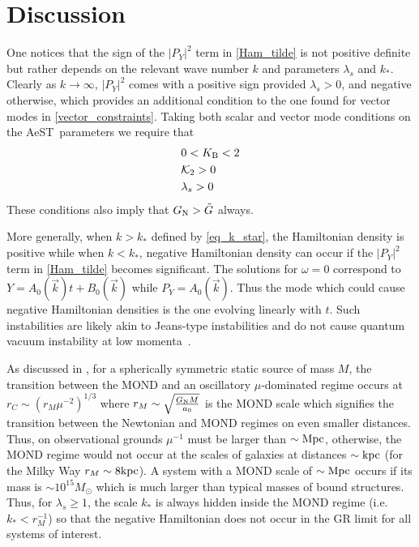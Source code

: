 \documentclass[twocolumn,prd,preprintnumbers,amsmath,amssymb,nofootinbib,superscriptaddress]{revtex4-1}
\newcommand{\AeST}{AeST~}
\newcommand{\lambdas}{\lambda_s}
\newcommand{\Mpc}{\ensuremath{{\rm Mpc}}}
\newcommand{\kpc}{\ensuremath{{\rm kpc}}}
\newcommand{\Kcal}{{\cal K}}
\newcommand{\Gt}{\ensuremath{\tilde{G}}}
\newcommand{\GN}{\ensuremath{G_{{\rm N}}}}
\newcommand{\KB}{\ensuremath{K_{{\rm B}}}}
\begin{document}
\section{Discussion}
\label{Sec_discussion}
One notices that the sign of the $|P_Y|^2$ term in \eqref{Ham_tilde}  is not positive definite but rather depends on the relevant wave number $k$ and parameters $\lambdas$ and $k_*$.
Clearly as $k\rightarrow \infty$, $|P_Y|^2$ comes with a positive sign provided $\lambdas>0$, and negative otherwise, which provides an additional condition to the one found for
vector modes in \eqref{vector_constraints}.
Taking both scalar and vector mode conditions on the \AeST parameters we require that 
\begin{align}
& 0 < \KB < 2
\\
& 
 \Kcal_2 > 0
\\
& \lambdas >0
\end{align}
These conditions also imply that $\GN > \Gt$ always.

More generally, when $k> k_*$ defined 
by \eqref{eq_k_star}, the Hamiltonian density is positive while when $k< k_*$, negative Hamiltonian density can occur if the $|P_Y|^2$ term in \eqref{Ham_tilde} becomes
significant. The solutions for $\omega=0$ correspond to $Y = A_0(\vec{k}) t + B_0(\vec{k})$ while $P_Y = A_0(\vec{k})$. Thus the mode which could cause negative 
Hamiltonian densities is the one evolving linearly with $t$.
Such instabilities are likely akin to Jeans-type instabilities and do not cause quantum vacuum instability at low momenta~\cite{GumrukcuogluMukohyamaSotiriou2016}.     


As discussed in \cite{Skordis:2020eui}, for a spherically symmetric static source of mass $M$, the transition between the MOND and an oscillatory $\mu$-dominated regime 
occurs at $r_C \sim \left(r_M \mu^{-2}\right)^{1/3}$ where $r_M \sim \sqrt{\frac{\GN M}{a_0}}$ is the MOND scale which signifies the transition between the Newtonian 
and MOND regimes on even smaller distances.  Thus, on observational grounds $\mu^{-1}$ must be larger than $\sim \Mpc$, otherwise, the MOND regime would not occur at the scales of galaxies 
at distances $\sim \kpc$ (for the Milky Way $r_M \sim 8 \kpc$).  A system with a MOND scale of $\sim \Mpc$ occurs if its mass is $\sim 10^{15} M_{\odot}$  which is much larger than
typical masses of bound structures.
Thus, for $\lambdas \ge 1$, the scale $k_*$ is always hidden inside the MOND regime (i.e. $k_* < r_M^{-1}$) so that the 
 negative Hamiltonian does not occur in the GR limit for all systems of interest.
\end{document}

